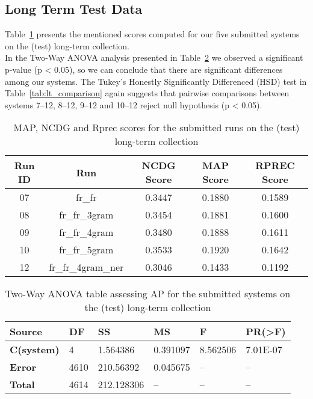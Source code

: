 \subsection{Long Term Test Data}\label{subsec:long_term}

Table~\ref{tab:lt_scores} presents the mentioned scores computed for our five submitted systems on the (test)
long-term collection.\\

In the Two-Way ANOVA analysis presented in Table~\ref{tab:lt_anova} we observed a significant p-value (p < 0.05), so we
can conclude that there are significant differences among our systems.
The Tukey's Honestly Significantly Differenced (HSD) test in Table~\ref{tab:lt_comparison} again suggests that pairwise
comparisons between systems 7--12, 8--12, 9--12 and 10--12 reject null hypothesis (p < 0.05).

\begin{table}[h!]
    \begin{center}
        \caption{MAP, NCDG and Rprec scores for the submitted runs on the (test) long-term collection}
        \label{tab:lt_scores}
        \begin{tabular}{|c|c||c|c|c|}
            \hline
            \textbf{Run ID} & \textbf{Run} & \textbf{NCDG Score} & \textbf{MAP Score} & \textbf{RPREC Score}\\
            \hline\hline
            07 & fr\_fr & 0.3447 & 0.1880 & 0.1589 \\
            \hline
            08 & fr\_fr\_3gram & 0.3454 & 0.1881 & 0.1600 \\
            \hline
            09 & fr\_fr\_4gram & 0.3480 & 0.1888 & 0.1611 \\
            \hline
            10 & fr\_fr\_5gram & 0.3533 & 0.1920 & 0.1642 \\
            \hline
            12 & fr\_fr\_4gram\_ner & 0.3046 & 0.1433 & 0.1192\\
            \hline
        \end{tabular}
    \end{center}
\end{table}

\begin{table}[!ht]
    \centering
    \caption{Two-Way ANOVA table assessing AP for the submitted systems on the (test) long-term collection}
    \label{tab:lt_anova}
    \begin{tabular}{|l|l|l|l|l|l|}
    \hline
        \textbf{Source} & \textbf{DF} & \textbf{SS} & \textbf{MS} & \textbf{F} & \textbf{PR(>F)} \\ \hline\hline
        \textbf{C(system)} & 4 & 1.564386 & 0.391097 & 8.562506 & 7.01E-07 \\ \hline
        \textbf{Error} & 4610 & 210.56392 & 0.045675 & -- & -- \\ \hline
        \textbf{Total} & 4614 & 212.128306 & -- & -- & -- \\ \hline
    \end{tabular}
\end{table}

